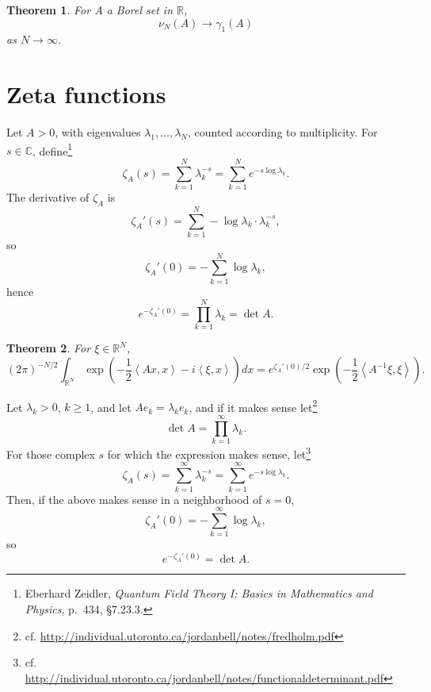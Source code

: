 \documentclass{article}
\newcommand{\inner}[2]{\left\langle #1, #2 \right\rangle}
\newtheorem{theorem}{Theorem}
\theoremstyle{definition}
\begin{document}
\begin{theorem}
For $A$ a Borel set in $\mathbb{R}$,
\[
\nu_N(A) \to \gamma_1(A)
\]
as $N \to \infty$. 
\end{theorem}






\section{Zeta functions}
Let $A>0$, with eigenvalues
 $\lambda_1,
\ldots,\lambda_N$, counted according to multiplicity.
For $s \in \mathbb{C}$, define\footnote{Eberhard Zeidler,
{\em Quantum Field Theory I: Basics in Mathematics and Physics},
p.~434, \S 7.23.3.}
\[
\zeta_A(s) = \sum_{k=1}^N \lambda_k^{-s} = \sum_{k=1}^N e^{-s \log \lambda_k}.
\]
The derivative of $\zeta_A$ is
\[
\zeta_A'(s) = \sum_{k=1}^N -\log \lambda_k \cdot \lambda_k^{-s},
\]
so
\[
\zeta_A'(0) = - \sum_{k=1}^N \log \lambda_k,
\]
hence
\[
e^{-\zeta_A'(0)} = \prod_{k=1}^N \lambda_k = \det A.
\]

\begin{theorem}
For $\xi \in \mathbb{R}^N$,
\[
(2\pi)^{-N/2} \int_{\mathbb{R}^N}  \exp\left(-\frac{1}{2} \inner{Ax}{x} - i\inner{\xi}{x} \right) dx
=e^{\zeta_A'(0)/2}  \exp\left( -\frac{1}{2} \inner{A^{-1} \xi}{\xi} \right).
\]
\end{theorem}

Let $\lambda_k>0$, $k \geq 1$, and
let $Ae_k = \lambda_k e_k$, and if it makes sense let\footnote{cf. \url{http://individual.utoronto.ca/jordanbell/notes/fredholm.pdf}}
\[
\det A = \prod_{k=1}^\infty \lambda_k.
\]
For those complex $s$ for which the expression makes sense,
let\footnote{cf. \url{http://individual.utoronto.ca/jordanbell/notes/functionaldeterminant.pdf}}
\[
\zeta_A(s) = \sum_{k=1}^\infty \lambda_k^{-s} = \sum_{k=1}^\infty e^{-s \log \lambda_k}.
\]
Then, if the above makes sense in a neighborhood of $s=0$,
\[
\zeta_A'(0) =  - \sum_{k=1}^\infty \log \lambda_k,
\]
so
\[
e^{-\zeta_A'(0)} = \det A.
\]
\end{document}
